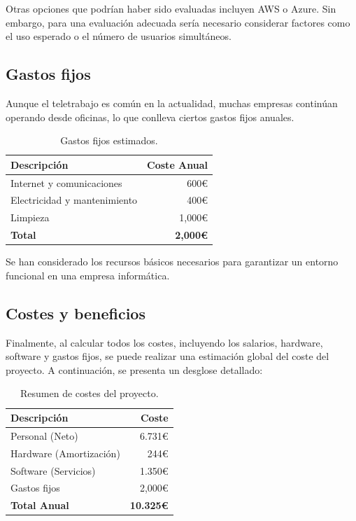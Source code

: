 Otras opciones que podrían haber sido evaluadas incluyen AWS o Azure. Sin embargo, para una evaluación adecuada sería necesario considerar factores como el uso esperado o el número de usuarios simultáneos.

\subsection{Gastos fijos}

Aunque el teletrabajo es común en la actualidad, muchas empresas continúan operando desde oficinas, lo que conlleva ciertos gastos fijos anuales.

\begin{table}[H]
\centering
\begin{tabular}{lr}
\toprule
Descripción & Coste Anual \\ 
\midrule
Internet y comunicaciones & 600€ \\
Electricidad y mantenimiento & 400€ \\
Limpieza & 1,000€ \\
\textbf{Total} & \textbf{2,000€} \\ 
\bottomrule
\end{tabular}
\caption{Gastos fijos estimados.}
\end{table}

Se han considerado los recursos básicos necesarios para garantizar un entorno funcional en una empresa informática.

\subsection{Costes y beneficios}

Finalmente, al calcular todos los costes, incluyendo los salarios, hardware, software y gastos fijos, se puede realizar una estimación global del coste del proyecto. A continuación, se presenta un desglose detallado:

\begin{table}[H]
\centering
\begin{tabular}{lr}
\toprule
Descripción & Coste \\ 
\midrule
Personal (Neto) & 6.731€ \\ 
Hardware (Amortización) & 244€ \\ 
Software (Servicios) & 1.350€  \\ 
Gastos fijos & 2,000€ \\ 
\textbf{Total Anual} & \textbf{10.325€} \\ 
\bottomrule
\end{tabular}
\caption{Resumen de costes del proyecto.}
\end{table}

